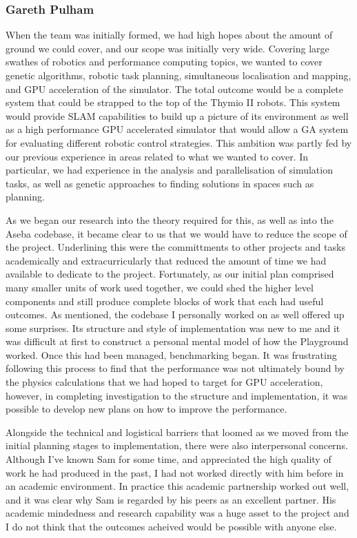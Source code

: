 \subsubsection{Gareth Pulham}
When the team was initially formed, we had high hopes about the amount of
ground we could cover, and our scope was initially very wide. Covering large
swathes of robotics and performance computing topics, we wanted to cover
genetic algorithms, robotic task planning, simultaneous localisation and
mapping, and GPU acceleration of the simulator. The total outcome would be
a complete system that could be strapped to the top of the Thymio II robots.
This system would provide SLAM capabilities to build up a picture of its
environment as well as a high performance GPU accelerated simulator that would
allow a GA system for evaluating different robotic control strategies. This
ambition was partly fed by our previous experience in areas related to what we
wanted to cover. In particular, we had experience in the analysis and
parallelisation of simulation tasks, as well as genetic approaches to finding
solutions in spaces such as planning.

As we began our research into the theory required for this, as well as into the
Aseba codebase, it became clear to us that we would have to reduce the scope of
the project. Underlining this were the committments to other projects and tasks
academically and extracurricularly that reduced the amount of time we had
available to dedicate to the project. Fortunately, as our initial plan
comprised many smaller units of work used together, we could shed the higher
level components and still produce complete blocks of work that each had useful
outcomes. As mentioned, the codebase I personally worked on as well offered up
some surprises. Its structure and style of implementation was new to me and
it was difficult at first to construct a personal mental model of how the
Playground worked. Once this had been managed, benchmarking began. It was
frustrating following this process to find that the performance was not
ultimately bound by the physics calculations that we had hoped to target for
GPU acceleration, however, in completing investigation to the structure and
implementation, it was possible to develop new plans on how to improve the
performance.

Alongside the technical and logistical barriers that loomed as we moved from
the initial planning stages to implementation, there were also interpersonal
concerns. Although I've known Sam for some time, and appreciated the high
quality of work he had produced in the past, I had not worked directly with him
before in an academic environment. In practice this academic partnership worked
out well, and it was clear why Sam is regarded by his peers as an excellent
partner. His academic mindedness and research capability was a huge asset to
the project and I do not think that the outcomes acheived would be possible
with anyone else.

